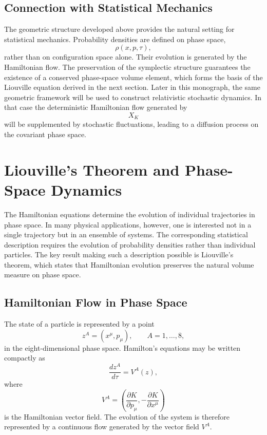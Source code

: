 \subsection{Connection with Statistical Mechanics}
The geometric structure developed above provides the natural setting for
statistical mechanics.
Probability densities are defined on phase space,
\[\rho(x,p,\tau),\]
rather than on configuration space alone.
Their evolution is generated by the Hamiltonian flow.
The preservation of the symplectic structure guarantees the existence of
a conserved phase-space volume element, which forms the basis of the
Liouville equation derived in the next section.
Later in this monograph, the same geometric framework will be used to
construct relativistic stochastic dynamics. In that case the
deterministic Hamiltonian flow generated by
\[X_K\]
will be supplemented by stochastic fluctuations, leading to a diffusion
process on the covariant phase space.
\section{Liouville's Theorem and Phase-Space Dynamics}
The Hamiltonian equations determine the evolution of individual
trajectories in phase space. In many physical applications, however,
one is interested not in a single trajectory but in an ensemble of
systems. The corresponding statistical description requires the
evolution of probability densities rather than individual particles.
The key result making such a description possible is Liouville's
theorem, which states that Hamiltonian evolution preserves the natural
volume measure on phase space.
\subsection{Hamiltonian Flow in Phase Space}
The state of a particle is represented by a point
\[z^A=(x^\mu,p_\mu),\qquad A=1,\ldots,8,\]
in the eight-dimensional phase space.
Hamilton's equations may be written compactly as
\[\frac{dz^A}{d\tau}=V^A(z),\]
where
\[V^A=\left(\frac{\partial K}{\partial p_\mu},
-\frac{\partial K}{\partial x^\mu}\right)\]
is the Hamiltonian vector field.
The evolution of the system is therefore represented by a continuous
flow generated by the vector field \(V^A\).
